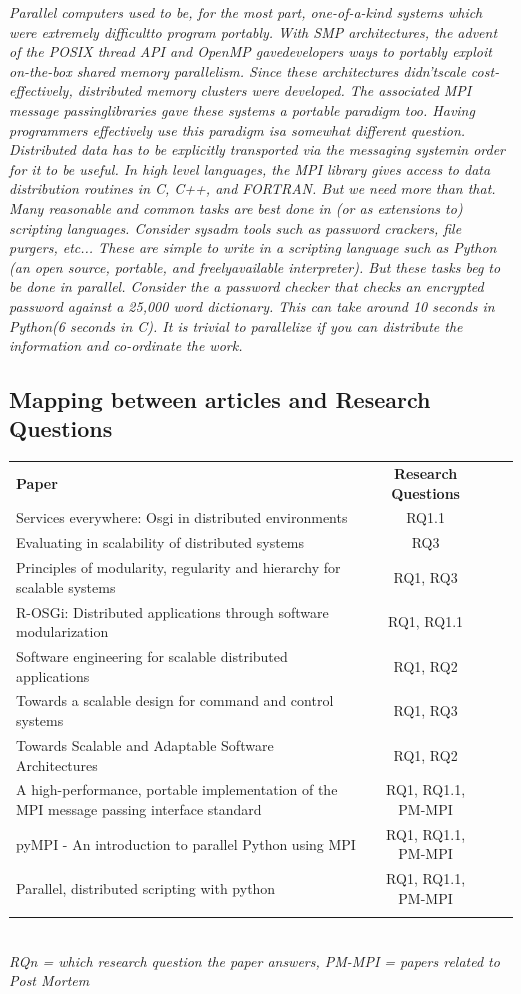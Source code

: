 \documentclass{article}
\begin{document}
\emph{Parallel computers used to be, for the most part, one-of-a-kind systems
which were extremely difficultto program portably. With SMP architectures, the
advent of the POSIX thread API and OpenMP gavedevelopers ways to portably
exploit on-the-box shared memory parallelism. Since these architectures
didn’tscale cost-effectively, distributed memory clusters were developed. The
associated MPI message passinglibraries gave these systems a portable paradigm
too. Having programmers effectively use this paradigm isa somewhat different
question. Distributed data has to be explicitly transported via the messaging
systemin order for it to be useful. In high level languages, the MPI library
gives access to data distribution routines in C, C++, and FORTRAN. But we need
more than that. Many reasonable and common tasks are best done in (or as
extensions to) scripting languages. Consider sysadm tools such as password
crackers, file purgers, etc... These are simple to write in a scripting
language such as Python (an open source, portable, and freelyavailable
interpreter). But these tasks beg to be done in parallel. Consider the a
password checker that checks an encrypted password against a 25,000 word
dictionary. This can take around 10 seconds in Python(6 seconds in C). It is
trivial to parallelize if you can distribute the information and co-ordinate
the work.}

\subsection{Mapping between articles and Research Questions}
\begin{tabular}{p{8cm} c c r}
  \rowcolor[gray]{0.5}
  {\bf Paper} & {\bf Research Questions} \\
  Services everywhere: Osgi in distributed environments & RQ1.1 \\
  Evaluating in scalability of distributed systems & RQ3 \\
  Principles of modularity, regularity and hierarchy for scalable systems & RQ1, RQ3 \\
  R-OSGi: Distributed applications through software modularization & RQ1, RQ1.1 \\
  Software engineering for scalable distributed applications & RQ1, RQ2 \\
  Towards a scalable design for command and control systems & RQ1, RQ3 \\
  Towards Scalable and Adaptable Software Architectures & RQ1, RQ2 \\
  A high-performance, portable implementation of the MPI message passing interface standard & RQ1, RQ1.1, PM-MPI \\
  pyMPI - An introduction to parallel Python using MPI & RQ1, RQ1.1, PM-MPI \\
  Parallel, distributed scripting with python & RQ1, RQ1.1, PM-MPI \\
\rowcolor[gray]{0.5}
\end{tabular}
\\\small \emph{RQ{n} = which research question the paper answers,
 PM-MPI = papers related to Post Mortem }




\end{document}
